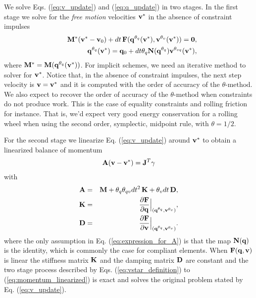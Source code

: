 We solve Eqs. (\ref{eq:v_update}) and (\ref{eq:q_update}) in two stages. In the
first stage we solve for the \textit{free motion} velocities ${\mathbf{v}}^*$ in the
absence of constraint impulses 
\begin{eqnarray}
	&&\mf{M}^*(\mf{v}^*-\mf{v}_0) + dt\,\mf{F}(\mf{q}^{\theta_q}(\mf{v}^*), \mf{v}^{\theta_v}(\mf{v}^*)) = \mf{0},
	\label{eq:vstar_definition}\\
	&&\mf{q}^{\theta_q}(\mf{v}^*) = \mf{q}_0 + dt\theta_q\mf{N}(\mf{q}^{\theta_{q}})\mf{v}^{\theta_{vq}}(\mf{v}^*),
	\label{eq:qstar_definition}
\end{eqnarray}
where ${\mathbf{M}}^* = {\mathbf{M}}({\mathbf{q}}^{\theta_q}({\mathbf{v}}^*))$. For implicit schemes,
we need an iterative method to solver for ${\mathbf{v}}^*$. Notice that, in the
absence of constraint impulses, the next step velocity is ${\mathbf{v}}={\mathbf{v}}^*$ and
it is computed with the order of accuracy of the $\theta\text{-method}$. We also
expect to recover the order of accuracy of the $\theta\text{-method}$ when
constraints do not produce work. This is the case of equality constraints and
rolling friction for instance. That is, we'd expect very good energy
conservation for a rolling wheel when using the second order, symplectic,
midpoint rule, with $\theta=1/2$.

For the second stage we linearize Eq. (\ref{eq:v_update})
around ${\mathbf{v}}^*$ to obtain a linearized balance of momentum
\begin{eqnarray}
	\mf{A}(\mf{v}-\mf{v}^*)= \mf{J}^T\mf{\gamma}
	\label{eq:momentum_linearized}
\end{eqnarray}
with
\begin{eqnarray}
	\mf{A}&=&\mf{M}+\theta_q\theta_{qv} dt^2\,\mf{K}+\theta_v dt\,\mf{D},
	\label{eq:expression_for_A}\\
	\mf{K}&=&\frac{\partial \mf{F}}{\partial \mf{q}}\Bigr|_{(\mf{q}^{\theta_q}, \mf{v}^{\theta_v})},\\
	\mf{D}&=&\frac{\partial \mf{F}}{\partial \mf{v}}\Bigr|_{(\mf{q}^{\theta_q},
	\mf{v}^{\theta_v})}.
	\label{eq:dissipation_matrix}
\end{eqnarray}
where the only assumption in Eq. (\ref{eq:expression_for_A}) is that the map
${\mathbf{N}}({\mathbf{q}})$ is the identity, which is commonly the case for compliant
elements. When ${\mathbf{F}}({\mathbf{q}}, {\mathbf{v}})$ is linear the stiffness matrix ${\mathbf{K}}$ and the
damping matrix ${\mathbf{D}}$ are constant and the two stage process described by Eqs.
(\ref{eq:vstar_definition}) to (\ref{eq:momentum_linearized}) is exact and
solves the original problem stated by Eq. (\ref{eq:v_update}).


